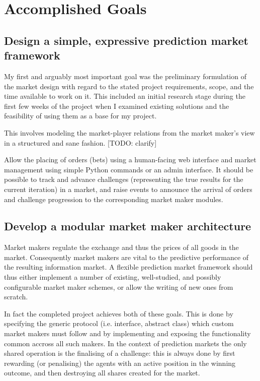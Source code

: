 \documentclass[bsc,frontabs,twoside,singlespacing,parskip,deptreport]{infthesis}     %
\begin{document}
\section{Accomplished Goals}

\subsection{Design a simple, expressive prediction market framework}

	My first and arguably most important goal was the preliminary formulation of the market design with regard to the stated project requirements, scope, and the time available to work on it. This included an initial research stage during the first few weeks of the project when I examined existing solutions and the feasibility of using them as a base for my project. 
    
This involves modeling the market-player relations from the market maker’s view in a structured and sane fashion. [TODO: clarify]

Allow the placing of orders (bets) using a human-facing web interface and market management using simple Python commands or an admin interface. It should be possible to track and advance challenges (representing the true results for the current iteration) in a market, and raise events to announce the arrival of orders and challenge progression to the corresponding market maker modules. 

\subsection{Develop a modular market maker architecture}

Market makers regulate the exchange and thus the prices of all goods in the market. Consequently market makers are vital to the predictive performance of the resulting information market. A flexible prediction market framework should thus either implement a number of existing, well-studied, and possibly configurable market maker schemes, or allow the writing of new ones from scratch. 

In fact the completed project achieves both of these goals. This is done by specifying the generic protocol (i.e. interface, abstract class) which custom market makers must follow and by implementing and exposing the functionality common accross all such makers. In the context of prediction markets the only shared operation is the finalising of a challenge: this is always done by first rewarding (or penalising) the agents with an active position in the winning outcome, and then destroying all shares created for the market. 
\end{document}
